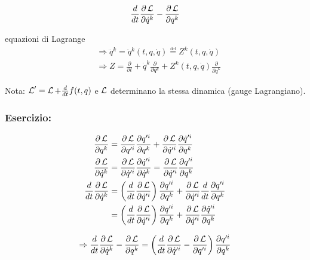\begin{equation*}
\frac{d}{dt} \frac{\partial \operatorname{\mathcal{L}}}{\partial \dot{q}^k} - \frac{\partial \operatorname{\mathcal{L}}}{\partial q^k}
\end{equation*}

equazioni di Lagrange \\

\begin{align*}
&\Rightarrow \ddot{q}^k = \ddot{q}^k (t, q, \dot{q}) \overset{\underset{\mathrm{def}}{}}{=} Z^k (t, q, \dot{q}) \\
&\Rightarrow Z = \frac{\partial}{\partial t} + \dot{q}^k \frac{\partial}{\partial q^k} + Z^k (t, q, \dot{q}) \frac{\partial}{\partial \dot{q}^k}
\end{align*}

Nota: $ \operatorname{\mathcal{L}}' = \operatorname{\mathcal{L}} + \frac{d}{dt} f (t, q) $ e $ \operatorname{\mathcal{L}} $ determinano la stessa dinamica (gauge Lagrangiano). \\

\subsubsection*{Esercizio:}

\begin{align*}
\frac{\partial \operatorname{\mathcal{L}}}{\partial q^k} &= \frac{\partial \operatorname{\mathcal{L}}}{\partial q'^i} \frac{\partial q'^i}{\partial q^k} + \frac{\partial \operatorname{\mathcal{L}}}{\partial \dot{q}'^i} \frac{\partial \dot{q}'^i}{\partial q^k}
\\
\frac{\partial \operatorname{\mathcal{L}}}{\partial \dot{q}^k} &= \frac{\partial \operatorname{\mathcal{L}}}{\partial \dot{q}'^i} \frac{\partial \dot{q}'^i}{\partial \dot{q}^k} = \frac{\partial \operatorname{\mathcal{L}}}{\partial \dot{q}'^i} \frac{\partial q'^i}{\partial q^k}
\\
\frac{d}{dt} \frac{\partial \operatorname{\mathcal{L}}}{\partial \dot{q}^k} &= \left( \frac{d}{dt} \frac{\partial \operatorname{\mathcal{L}}}{\partial \dot{q}'^i} \right) \frac{\partial q'^i}{\partial q^k} + \frac{\partial \operatorname{\mathcal{L}}}{\partial \dot{q}'^i} \frac{d}{dt} \frac{\partial q'^i}{\partial q^k}
\\
&= \left( \frac{d}{dt} \frac{\partial \operatorname{\mathcal{L}}}{\partial \dot{q}'^i} \right) \frac{\partial q'^i}{\partial q^k} + \frac{\partial \operatorname{\mathcal{L}}}{\partial \dot{q}'^i} \frac{\partial \dot{q}'^i}{\partial q^k}
\end{align*}

\begin{equation*}
\Rightarrow \frac{d}{dt} \frac{\partial \operatorname{\mathcal{L}}}{\partial \dot{q}^k} - \frac{\partial \operatorname{\mathcal{L}}}{\partial q^k} = \left( \frac{d}{dt} \frac{\partial \operatorname{\mathcal{L}}}{\partial \dot{q}'^i} - \frac{\partial \operatorname{\mathcal{L}}}{\partial q'^i} \right) \frac{\partial q'^i}{\partial q^k}
\end{equation*}

